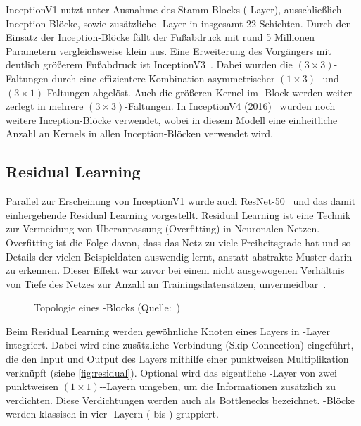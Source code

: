 InceptionV1 nutzt unter Ausnahme des Stamm-Blocks (\stem-Layer), ausschließlich Inception-Blöcke, sowie zusätzliche \pool-Layer in insgesamt 22 Schichten.
Durch den Einsatz der Inception-Blöcke fällt der Fußabdruck mit rund 5 Millionen Parametern vergleichsweise klein aus.
Eine Erweiterung des Vorgängers mit deutlich größerem Fußabdruck ist InceptionV3~\cite{Szegedy15}.
Dabei wurden die $(3 \times 3)$-Faltungen durch eine effizientere Kombination asymmetrischer $(1 \times 3)$- und $(3 \times 1)$-Faltungen abgelöst.
Auch die größeren Kernel im \stem-Block werden weiter zerlegt in mehrere $(3 \times 3)$-Faltungen.
In InceptionV4 (2016)~\cite{Szegedy16} wurden noch weitere Inception-Blöcke verwendet, wobei in diesem Modell eine einheitliche Anzahl an Kernels in allen Inception-Blöcken verwendet wird.

\subsection{Residual Learning}
\label{subsec:residual-learning}

Parallel zur Erscheinung von InceptionV1 wurde auch ResNet-50~\cite{He15} und das damit einhergehende Residual Learning vorgestellt.
Residual Learning ist eine Technik zur Vermeidung von Überanpassung (Overfitting) in Neuronalen Netzen.
Overfitting ist die Folge davon, dass das Netz zu viele Freiheitsgrade hat und so Details der vielen Beispieldaten auswendig lernt, anstatt abstrakte Muster darin zu erkennen.
Dieser Effekt war zuvor bei einem nicht ausgewogenen Verhältnis von Tiefe des Netzes zur Anzahl an Trainingsdatensätzen, unvermeidbar~\cite{Gugger20}.

\begin{figure}[hb!]
    \centering
    \caption[Topologie eines \res-Blocks]{Topologie eines \res-Blocks (Quelle:~\cite{Karim19})}
    \label{fig:residual}
\end{figure}

Beim Residual Learning werden gewöhnliche Knoten eines Layers in \res-Layer integriert.
Dabei wird eine zusätzliche Verbindung (Skip Connection) eingeführt, die den Input und Output des Layers mithilfe einer punktweisen Multiplikation verknüpft (siehe \autoref{fig:residual}).
Optional wird das eigentliche \conv-Layer von zwei punktweisen $(1 \times 1)$-\conv-Layern umgeben, um die Informationen zusätzlich zu verdichten.
Diese Verdichtungen werden auch als Bottlenecks bezeichnet.
\res-Blöcke werden klassisch in vier \res-Layern ( bis ) gruppiert.

